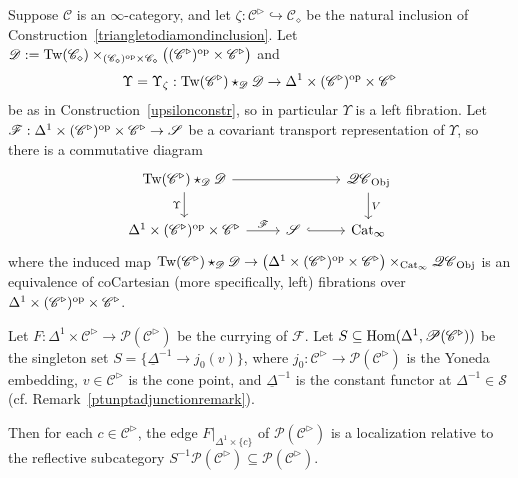 \documentclass{tac}
\newcommand{\s}[1]{\mathscr{#1}}
\newcommand{\tx}[1]{\textnormal{#1}}
\newcommand{\ul}[1]{\underline{#1}}
\begin{document}
\begin{proposition}\label{zetaobjectwiselocalization} Suppose $\s{C}$ is an $\infty$-category, and let $\zeta : \s{C}^{\triangleright} \hookrightarrow \s{C}_\diamond$ be the natural inclusion of Construction~\ref{triangletodiamondinclusion}.   Let $\s{D} := \tx{Tw}(\s{C}_\diamond) \times_{ (\s{C}_\diamond )^\tx{op} \times \s{C}_\diamond} \big( (\s{C}^\triangleright )^\tx{op}\times \s{C}^\triangleright \big)$ and 
\[\Upsilon = \Upsilon_{\zeta} : \tx{Tw}(\s{C}^\triangleright )\star_{\s{D}} \s{D} \to \Delta^1 \times (\s{C}^\triangleright )^\tx{op} \times \s{C}^\triangleright \] 
be as in Construction~\ref{upsilonconstr}, so in particular $\Upsilon$ is a left fibration.  Let $\s{F} : \Delta^1 \times (\s{C}^\triangleright )^\tx{op} \times \s{C}^\triangleright \to \s{S}$ be a covariant transport representation of $\Upsilon$, so there is a commutative diagram
\[\begin{tikzcd}
\tx{Tw}(\s{C}^\triangleright )\star_{\s{D}} \s{D}\arrow[]{d}[swap]{\Upsilon} \arrow[]{rr}  & & \s{{QC}}_{\tx{Obj}} \arrow[]{d}{V} 
\\
 \Delta^1 \times (\s{C}^\triangleright )^\tx{op} \times \s{C}^\triangleright \arrow[]{r}{\s{F}} & \s{S} \arrow[hook]{r} & \tx{Cat}_\infty
\end{tikzcd}\]
where the induced map $\tx{Tw}(\s{C}^\triangleright )\star_{\s{D}} \s{D} \to \big(  \Delta^1 \times (\s{C}^\triangleright )^\tx{op} \times \s{C}^\triangleright \big) \times_{\tx{Cat}_\infty} \s{{QC}}_{\tx{Obj}} $%
 is an equivalence of coCartesian (more specifically, left) fibrations over $ \Delta^1 \times (\s{C}^\triangleright )^\tx{op} \times \s{C}^\triangleright$.  

Let $F : \Delta^1 \times \s{C}^\triangleright \to \s{P}(\s{C}^\triangleright )$ be the currying of $\s{F}$.  Let $S \subseteq \tx{Hom}(\Delta^1 , \s{P}(\s{C}^\triangleright ))$ be the singleton set $S = \{ \ul{\Delta}^{-1} \to j_0 (v) \}$, where $j_0 : \s{C}^\triangleright \to \s{P}(\s{C}^\triangleright)$ is the Yoneda embedding, $v \in \s{C}^\triangleright$ is the cone point, and $\ul{\Delta}^{-1}$ is the constant functor at $\Delta^{-1} \in \s{S}$ (cf. Remark~\ref{ptunptadjunctionremark}).  

Then for each $c\in \s{C}^\triangleright$, the edge $F|_{\Delta^1 \times \{ c\}}$ of $\s{P}(\s{C}^\triangleright)$ is a localization relative to the reflective subcategory $S^{-1} \s{P}(\s{C}^\triangleright) \subseteq \s{P}(\s{C}^\triangleright)$.
\end{proposition}
\end{document}
